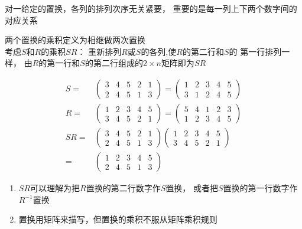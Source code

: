 \begin{note}
对一给定的置换，各列的排列次序无关紧要，
重要的是每一列上下两个数字间的对应关系
\end{note}


\begin{newdef}[置换的乘积]
两个{\color{seco}置换的乘积}定义为相继做两次置换\\
考虑$S$和$R$的乘积$SR$：
重新排列$R$或$S$的各列,使$R$的第二行和$S$的
第一行排列一样，
由$R$的第一行和$S$的第二行组成的$2×n$矩阵即为$SR$
\end{newdef}

\begin{example}[置换相乘]
	\begin{equation}\begin{aligned}
	\label{eq.6.1.3}
	S={}&
	\begin{pmatrix}
	3&4&5&2&1\\
	2&4&5&1&3
	\end{pmatrix}=
	\begin{pmatrix}
	1&2&3&4&5\\
	3&1&2&4&5
	\end{pmatrix}\\
	R={}&
	\begin{pmatrix}
	1&2&3&4&5\\
	3&4&5&2&1
	\end{pmatrix}=
	\begin{pmatrix}
	5&4&1&2&3\\
	1&2&3&4&5
	\end{pmatrix}\\
	SR={}&
	\begin{pmatrix}
	3&4&5&2&1\\
	2&4&5&1&3
	\end{pmatrix}
	\begin{pmatrix}
	1&2&3&4&5\\
	3&4&5&2&1
	\end{pmatrix}\\
	{}={}&
	\begin{pmatrix}
	1&2&3&4&5\\
	2&4&5&1&3
	\end{pmatrix}
	\end{aligned}\end{equation}
\end{example}

\begin{note}
\begin{enumerate}
\item 
\label{6.1.permutation}
$SR$可以理解为把$R$置换的第二行数字作$S$置换，
	或者把$S$置换的第一行数字作$R^{-1}$置换
	
\item 置换用矩阵来描写，但置换的乘积不服从矩阵乘积规则
\end{enumerate}
\end{note}

